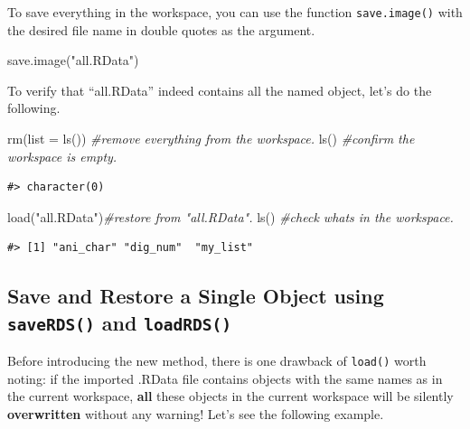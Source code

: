 \documentclass[
]{book}
\newenvironment{Shaded}{\begin{snugshade}}{\end{snugshade}}
\newcommand{\AttributeTok}[1]{\textcolor[rgb]{0.77,0.63,0.00}{#1}}
\newcommand{\CommentTok}[1]{\textcolor[rgb]{0.56,0.35,0.01}{\textit{#1}}}
\newcommand{\FunctionTok}[1]{\textcolor[rgb]{0.00,0.00,0.00}{#1}}
\newcommand{\NormalTok}[1]{#1}
\newcommand{\StringTok}[1]{\textcolor[rgb]{0.31,0.60,0.02}{#1}}
\begin{document}
To save everything in the workspace, you can use the function \texttt{save.image()} with the desired file name in double quotes as the argument.

\begin{Shaded}
\begin{Highlighting}[]
\FunctionTok{save.image}\NormalTok{(}\StringTok{"all.RData"}\NormalTok{)}
\end{Highlighting}
\end{Shaded}

To verify that ``all.RData'' indeed contains all the named object, let's do the following.

\begin{Shaded}
\begin{Highlighting}[]
\FunctionTok{rm}\NormalTok{(}\AttributeTok{list =} \FunctionTok{ls}\NormalTok{())  }\CommentTok{\#remove everything from the workspace.}
\FunctionTok{ls}\NormalTok{()             }\CommentTok{\#confirm the workspace is empty.}
\end{Highlighting}
\end{Shaded}

\begin{verbatim}
#> character(0)
\end{verbatim}

\begin{Shaded}
\begin{Highlighting}[]
\FunctionTok{load}\NormalTok{(}\StringTok{"all.RData"}\NormalTok{)}\CommentTok{\#restore from "all.RData".}
\FunctionTok{ls}\NormalTok{()             }\CommentTok{\#check what\textquotesingle{}s in the workspace.}
\end{Highlighting}
\end{Shaded}

\begin{verbatim}
#> [1] "ani_char" "dig_num"  "my_list"
\end{verbatim}

\hypertarget{save-and-restore-a-single-object-using-saverds-and-loadrds}{%
\subsection{\texorpdfstring{Save and Restore a Single Object using \texttt{saveRDS()} and \texttt{loadRDS()}}{Save and Restore a Single Object using saveRDS() and loadRDS()}}\label{save-and-restore-a-single-object-using-saverds-and-loadrds}}

Before introducing the new method, there is one drawback of \texttt{load()} worth noting: if the imported .RData file contains objects with the same names as in the current workspace, \textbf{all} these objects in the current workspace will be silently \textbf{overwritten} without any warning! Let's see the following example.
\end{document}
